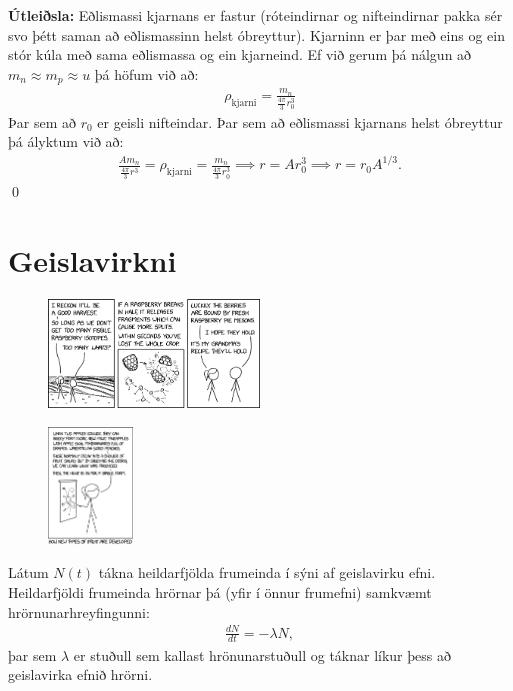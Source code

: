 \ifdefined \wholebook \else\documentclass[oneside]{book}\usepackage{EdlBook}\graphicspath{{figures/}}
\begin{document}
\textbf{Útleiðsla:} Eðlismassi kjarnans er fastur (róteindirnar og nifteindirnar pakka sér svo þétt saman að eðlismassinn helst óbreyttur). Kjarninn er þar með eins og ein stór kúla með sama eðlismassa og ein kjarneind. Ef við gerum þá nálgun að $m_n \approx m_p \approx u$ þá höfum við að:
\begin{align*}
    \rho_{\text{kjarni}} = \frac{m_n}{\frac{4\pi}{3}r_0^3}
\end{align*}
Þar sem að $r_0$ er geisli nifteindar. Þar sem að eðlismassi kjarnans helst óbreyttur þá ályktum við að:
\begin{align*}
    \frac{Am_n}{\frac{4\pi}{3}r^3} = \rho_{\text{kjarni}} = \frac{m_n}{\frac{4\pi}{3}r_0^3} \implies r = Ar_0^3 \implies r = r_0 A^{1/3}.
\end{align*}
\qed

\section{Geislavirkni}

\begin{figure}[H]
    \centering
    \includegraphics[width = 0.5\textwidth]{figures/fissile_raspberry_isotopes.png}
\end{figure}

\begin{figure}[H]
    \centering
    \includegraphics[width = 0.2\textwidth]{figures/fruit_collider.png}
\end{figure}

\begin{tcolorbox}
\begin{definition}
Látum $N(t)$ tákna heildarfjölda frumeinda í sýni af geislavirku efni. Heildarfjöldi frumeinda hrörnar þá (yfir í önnur frumefni) samkvæmt hrörnunarhreyfingunni: 
\begin{align*}
    \frac{dN}{dt} = -\lambda N,
\end{align*}
þar sem $\lambda$ er stuðull sem kallast hrönunarstuðull og táknar líkur þess að geislavirka efnið hrörni.
\end{definition}
\end{tcolorbox}
\end{document}
